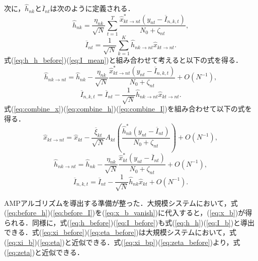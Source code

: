 次に，$\hat{h}_{nk}$と$\overline{I}_{nt}$は次のように定義される．
\begin{equation}
	\label{eq:h_before}
	\hat{h}_{nk}=
		\frac{\eta_{nk}}{\sqrt{N}}
		\sum_{t=1}^{T}
			\frac
				{\hat{x}^{*}_{kt\to nt}(y_{nt}-\overline{I}_{n,k,t})}
				{N_{0}+\zeta_{nt}},
\end{equation}
\begin{equation}
	\label{eq:I_before}
	\overline{I}_{nt} =
		\frac{1}{\sqrt{N}}
		\sum_{k=1}^{K}
			\hat{h}_{nk \to nt}\hat{x}_{kt \to nt}.
\end{equation}
式(\ref{eq:h_h_before})(\ref{eq:I_mean})と組み合わせて考えると以下の式を得る．
\begin{equation}
	\label{eq:combine_h}
	\hat{h}_{nk\to nt}=
		\hat{h}_{nk}
		-
		\frac{\eta_{nk}}{\sqrt{N}}
		\frac
			{\hat{x}^{*}_{kt\to nt}(y_{nt}-\overline{I}_{n,k,t})}
			{N_{0}+\zeta_{nt}}
		+ O(N^{-1}),
\end{equation}
\begin{equation}
	\label{eq:combine_I}
	\overline{I}_{n,k,t} =
		\overline{I}_{nt}
		-
		\frac{1}{\sqrt{N}}\hat{h}_{nk \to nt}\hat{x}_{kt \to nt}.
\end{equation}
式(\ref{eq:combine_x})(\ref{eq:combine_h})(\ref{eq:combine_I})を組み合わせて以下の式を得る．
\begin{equation}
	\label{eq:before_x}
	\hat{x}_{kt \to nt}	=
		\hat{x}_{kt}
		-\frac{\overline{\xi}_{kt}}{\sqrt{N}}A_{kt}
		\left(
			\frac{\hat{h}^{*}_{nk}
			\left(
				y_{nt} -  \overline{I}_{nt}
			\right)}
			{N_0 + \zeta_{nt}}
		\right)+O(N^{-1}),	
\end{equation}
\begin{equation}
	\label{eq:before_h}
	\hat{h}_{nk\to nt}=
		\hat{h}_{nk}
		-
		\frac{\eta_{nk}}{\sqrt{N}}
		\frac
			{\hat{x}^{*}_{kt}(y_{nt}-\overline{I}_{nt})}
			{N_{0}+\zeta_{nt}}
		+ O(N^{-1}),
\end{equation}
\begin{equation}
	\label{eq:before_I}
	\overline{I}_{n,k,t} =
		\overline{I}_{nt}
		-
		\frac{1}{\sqrt{N}}\hat{h}_{nk}\hat{x}_{kt}+ O(N^{-1}).
\end{equation}

AMPアルゴリズムを導出する準備が整った．大規模システムにおいて，式(\ref{eq:before_h})(\ref{eq:before_I})を(\ref{eq:x_b_vanish})に代入すると，(\ref{eq:x_b})が得られる．同様に，式(\ref{eq:h_before})(\ref{eq:I_before})も式(\ref{eq:h_h})(\ref{eq:I_b})と導出できる．式(\ref{eq:xi_before})(\ref{eq:eta_before})は大規模システムにおいて，式(\ref{eq:xi_b})(\ref{eq:eta})と近似できる．式(\ref{eq:xi_bp})(\ref{eq:zeta_before})より，式(\ref{eq:zeta})と近似できる．